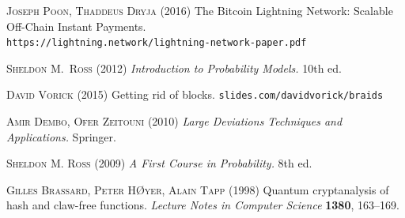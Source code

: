 \documentclass[12pt]{article}
\begin{document}
\begin{CJK}{UTF8}{bkai}
\begin{thebibliography}{9}
\textsc{Joseph Poon, Thaddeus Dryja} (2016)
The Bitcoin Lightning Network:
Scalable Off-Chain Instant Payments.\\
\texttt{https://lightning.network/lightning-network-paper.pdf}

 \textsc{Sheldon M.\ Ross} (2012) 
\textit{Introduction to Probability Models.} 10th ed.

\textsc{David Vorick} (2015)
Getting rid of blocks.
\texttt{slides.com/davidvorick/braids}


\textsc{Amir Dembo, Ofer Zeitouni} (2010)
\textit{Large Deviations Techniques and Applications.}
Springer.

 \textsc{Sheldon M. Ross} (2009) 
\textit{A First Course in Probability.} 8th ed.

 \textsc{Gilles Brassard, Peter HØyer, Alain Tapp} (1998)
Quantum cryptanalysis of hash and claw-free functions.
\textit{Lecture Notes in Computer Science} \textbf{1380},
163--169.


\end{thebibliography}
\end{CJK}
\end{document}
